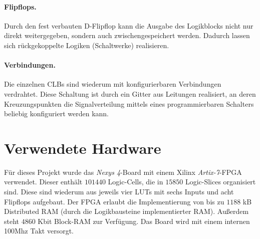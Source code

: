 \paragraph{Flipflops.} Durch den fest verbauten D-Flipflop kann die Ausgabe des Logikblocks nicht nur direkt weitergegeben, sondern auch zwischengespeichert werden. Dadurch lassen sich rückgekoppelte Logiken (Schaltwerke) realisieren. \cite[S. 13]{Chu}

\paragraph{Verbindungen.} Die einzelnen CLBs sind wiederum mit
konfigurierbaren Verbindungen verdrahtet. Diese Schaltung ist durch
ein Gitter aus Leitungen realisiert, an deren Kreuzungspunkten die Signalverteilung mittels eines programmierbaren Schalters beliebig konfiguriert werden kann. \cite[S. 12]{Chu}

\section{Verwendete Hardware}
Für dieses Projekt wurde das \emph{Nexys 4}-Board mit einem Xilinx
\emph{Artix-7}-FPGA verwendet. Dieser enthält $101440$ Logic-Cells, die
in $15850$ Logic-Slices organisiert sind. Diese sind wiederum aus
jeweils vier LUTs mit sechs Inputs und acht Flipflops aufgebaut. Der
FPGA erlaubt die Implementierung von bis zu $1188$ kB Distributed RAM
(durch die Logikbausteine implementierter RAM). Außerdem steht
$4860$ Kbit Block-RAM zur Verfügung. Das Board wird mit einem internen 
100Mhz Takt versorgt. \cite{Artix}
